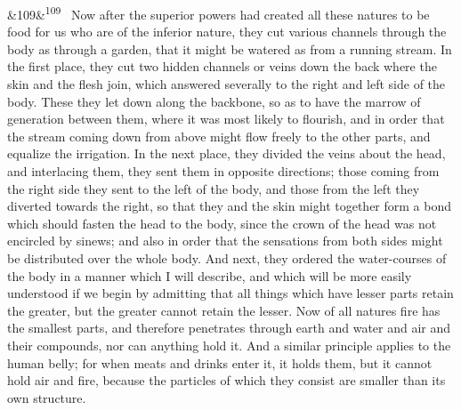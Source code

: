 \documentclass[12pt]{article}
\newcommand{\para}[1][]{\par\noindent\ifx&#1&\else\textsuperscript{\footnotesize #1}~\fi}
\begin{document}
\para[109] Now after the superior powers had created all these natures to be food for us who are of the inferior nature, they cut various channels through the body as through a garden, that it might be watered as from a running stream. In the first place, they cut two hidden channels or veins down the back where the skin and the flesh join, which answered severally to the right and left side of the body. These they let down along the backbone, so as to have the marrow of generation between them, where it was most likely to flourish, and in order that the stream coming down from above might flow freely to the other parts, and equalize the irrigation. In the next place, they divided the veins about the head, and interlacing them, they sent them in opposite directions; those coming from the right side they sent to the left of the body, and those from the left they diverted towards the right, so that they and the skin might together form a bond which should fasten the head to the body, since the crown of the head was not encircled by sinews; and also in order that the sensations from both sides might be distributed over the whole body. And next, they ordered the water-courses of the body in a manner which I will describe, and which will be more easily understood if we begin by admitting that all things which have lesser parts retain the greater, but the greater cannot retain the lesser. Now of all natures fire has the smallest parts, and therefore penetrates through earth and water and air and their compounds, nor can anything hold it. And a similar principle applies to the human belly; for when meats and drinks enter it, it holds them, but it cannot hold air and fire, because the particles of which they consist are smaller than its own structure.
\end{document}

